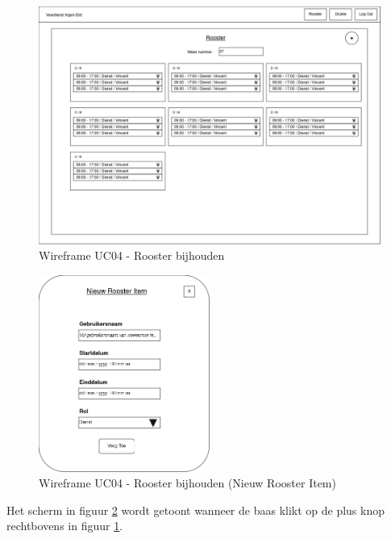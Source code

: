 \documentclass{article}
\begin{document}
\begin{figure}[H]
    \centering
    \includegraphics[width=1\textwidth]{images/wireframe_rooster_maken_1.drawio.png}
    \caption{Wireframe UC04 - Rooster bijhouden}
    \label{fig:wf4}
\end{figure}

\begin{figure}[H]
    \centering
    \includegraphics[width=0.5\textwidth]{images/wireframe_rooster_maken_2.drawio.png}
    \caption{Wireframe UC04 - Rooster bijhouden (Nieuw Rooster Item)}
    \label{fig:wf5}
\end{figure}
Het scherm in figuur \ref{fig:wf5} wordt getoont wanneer de baas klikt op de plus knop rechtbovens in figuur \ref{fig:wf4}.
\end{document}
